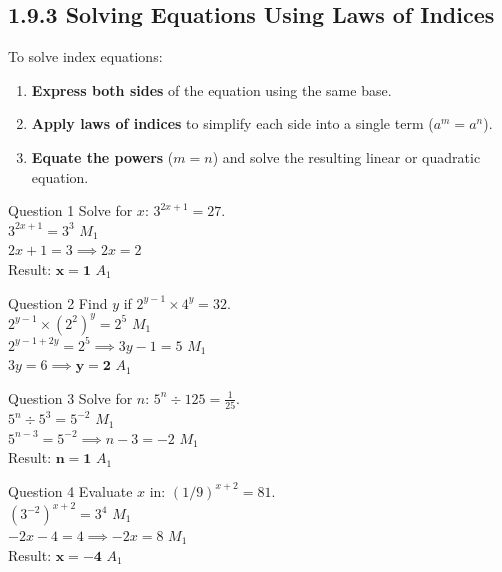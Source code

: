 \documentclass[12pt, a4paper, oneside]{article}
\begin{document}
\subsection*{1.9.3 Solving Equations Using Laws of Indices}

\begin{tcolorbox}[colback=lightgrey, colframe=primaryblue, title=\textbf{Strategy for Solving Equations}, arc=5pt]
    To solve index equations:
    \begin{enumerate}
        \item \textbf{Express both sides} of the equation using the same base.
        \item \textbf{Apply laws of indices} to simplify each side into a single term ($a^m = a^n$).
        \item \textbf{Equate the powers} ($m = n$) and solve the resulting linear or quadratic equation.
    \end{enumerate}
\end{tcolorbox}

\begin{solvingbox}{Question 1}
Solve for $x$: $3^{2x+1} = 27$. \\
$3^{2x+1} = 3^3$ \hfill $M_1$ \\
$2x + 1 = 3 \implies 2x = 2$ \\
Result: $\mathbf{x = 1}$ \hfill $A_1$
\end{solvingbox}

\begin{solvingbox}{Question 2}
Find $y$ if $2^{y-1} \times 4^y = 32$. \\
$2^{y-1} \times (2^2)^y = 2^5$ \hfill $M_1$ \\
$2^{y-1+2y} = 2^5 \implies 3y - 1 = 5$ \hfill $M_1$ \\
$3y = 6 \implies \mathbf{y = 2}$ \hfill $A_1$
\end{solvingbox}

\begin{solvingbox}{Question 3}
Solve for $n$: $5^{n} \div 125 = \frac{1}{25}$. \\
$5^n \div 5^3 = 5^{-2}$ \hfill $M_1$ \\
$5^{n-3} = 5^{-2} \implies n - 3 = -2$ \hfill $M_1$ \\
Result: $\mathbf{n = 1}$ \hfill $A_1$
\end{solvingbox}

\begin{solvingbox}{Question 4}
Evaluate $x$ in: $(1/9)^{x+2} = 81$. \\
$(3^{-2})^{x+2} = 3^4$ \hfill $M_1$ \\
$-2x - 4 = 4 \implies -2x = 8$ \hfill $M_1$ \\
Result: $\mathbf{x = -4}$ \hfill $A_1$
\end{solvingbox}
\end{document}
